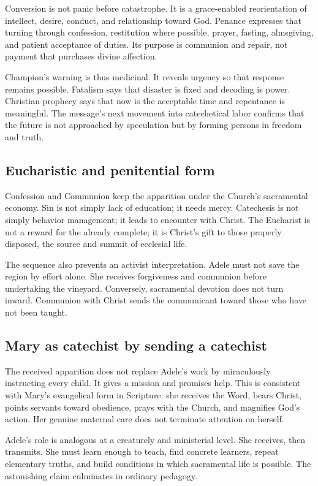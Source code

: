 Conversion is not panic before catastrophe. It is a grace-enabled reorientation of intellect, desire, conduct, and relationship toward God. Penance expresses that turning through confession, restitution where possible, prayer, fasting, almsgiving, and patient acceptance of duties. Its purpose is communion and repair, not payment that purchases divine affection.

Champion's warning is thus medicinal. It reveals urgency so that response remains possible. Fatalism says that disaster is fixed and decoding is power. Christian prophecy says that now is the acceptable time and repentance is meaningful. The message's next movement into catechetical labor confirms that the future is not approached by speculation but by forming persons in freedom and truth.

\subsection{Eucharistic and penitential form}

Confession and Communion keep the apparition under the Church's sacramental economy. Sin is not simply lack of education; it needs mercy. Catechesis is not simply behavior management; it leads to encounter with Christ. The Eucharist is not a reward for the already complete; it is Christ's gift to those properly disposed, the source and summit of ecclesial life.

The sequence also prevents an activist interpretation. Adele must not save the region by effort alone. She receives forgiveness and communion before undertaking the vineyard. Conversely, sacramental devotion does not turn inward. Communion with Christ sends the communicant toward those who have not been taught.

\subsection{Mary as catechist by sending a catechist}

The received apparition does not replace Adele's work by miraculously instructing every child. It gives a mission and promises help. This is consistent with Mary's evangelical form in Scripture: she receives the Word, bears Christ, points servants toward obedience, prays with the Church, and magnifies God's action. Her genuine maternal care does not terminate attention on herself.

Adele's role is analogous at a creaturely and ministerial level. She receives, then transmits. She must learn enough to teach, find concrete learners, repeat elementary truths, and build conditions in which sacramental life is possible. The astonishing claim culminates in ordinary pedagogy.

